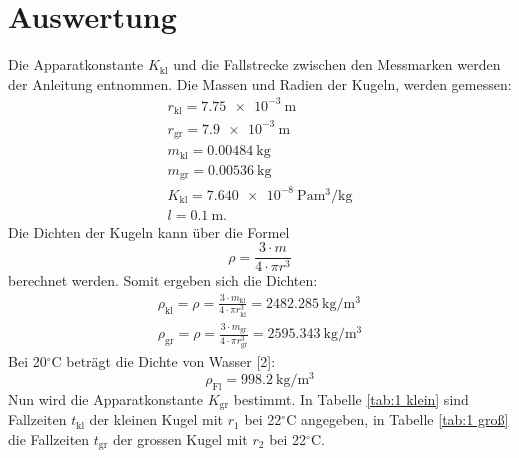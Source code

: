 \section{Auswertung}

Die Apparatkonstante $K_\text{kl}$ und die Fallstrecke zwischen den Messmarken werden der Anleitung entnommen. Die Massen und Radien der Kugeln, werden gemessen:
\begin{gather*}
	r_\text{kl} = \SI{7,75e-3}{\metre} \\
	r_\text{gr} = \SI{7,9e-3}{\metre}\\
	m_\text{kl} = \SI{0,00484}{\kilogram}\\
	m_\text{gr} = \SI{0,00536}{\kilogram}\\
	K_\text{kl} = \SI{7,640e-8}{\pascal\metre\cubed\per\kilogram}\\
	l = \SI{0,1}{\metre}.
\end{gather*}
Die Dichten der Kugeln kann über die Formel
\begin{equation}
	\rho = \frac{3\cdot m}{4\cdot \pi r^3}
\end{equation}
berechnet werden.
Somit ergeben sich die Dichten:
\begin{gather*}
	\rho_\text{kl} = \rho = \frac{3\cdot m_\text{kl}}{4\cdot \pi r_\text{kl}^3} = \SI{2482.285}{\kilogram\per\metre\cubed} \\
	\rho_\text{gr} = \rho = \frac{3\cdot m_\text{gr}}{4\cdot \pi r_\text{gr}^3} = \SI{2595.343}{\kilogram\per\metre\cubed}
\end{gather*}
Bei 20$^\circ$C beträgt die Dichte von Wasser [2]:
\begin{equation*}
	\rho_\text{Fl} = \SI{998,2}{\kilogram\per\metre\cubed}
\end{equation*}
Nun wird die Apparatkonstante $K_\text{gr}$ bestimmt.
In Tabelle \ref{tab:1 klein} sind Fallzeiten $t_\text{kl}$ der kleinen Kugel mit $r_1$ bei 22$^\circ$C angegeben, in Tabelle \ref{tab:1 groß} die Fallzeiten $t_\text{gr}$ der grossen Kugel mit $r_2$ bei 22$^\circ$C.
